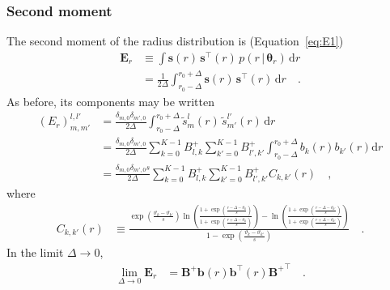 \documentclass[modern]{aastex62}
\begin{document}
\subsubsection{Second moment}
%
The second moment of the radius distribution is (Equation~\ref{eq:E1})
%
\begin{align}
    \mathbf{E}_r
     & \equiv
    \int
    \mathbf{s}(r) \,
    \mathbf{s}^\top(r) \,
    p(r \, \big| \, \pmb{\theta}_{r}) \,
    \mathrm{d}r
    \nonumber \\
     & =
    \frac{1}{2\Delta}
    \int_{r_0 - \Delta}^{r_0 + \Delta}
    \mathbf{s}(r) \,
    \mathbf{s}^\top(r) \,
    \mathrm{d}r
    \quad.
\end{align}
%
As before, its components may be written
%
%
\begin{align}
    (E_r)^{l,l'}_{m,m'}
     & =
    \frac{\delta_{m,0}\delta_{m',0}}{2\Delta}
    \int_{r_0 - \Delta}^{r_0 + \Delta}
    \tilde{s}^l_{m}(r) \,
    \tilde{s}^{l'}_{m'}(r) \,
    \mathrm{d}r
    \nonumber \\
     & =
    \frac{\delta_{m,0}\delta_{m',0}}{2\Delta}
    \sum_{k=0}^{K-1} B^+_{l,k}
    \sum_{k'=0}^{K-1} B^+_{l',k'}
    \int_{r_0 - \Delta}^{r_0 + \Delta}
    b_{k}(r)
    b_{k'}(r)
    \mathrm{d}r
    \nonumber \\
     & =
    \frac{\delta_{m,0}\delta_{m',0}s}{2\Delta}
    \sum_{k=0}^{K-1} B^+_{l,k}
    \sum_{k'=0}^{K-1} B^+_{l',k'}
    C_{k,k'}(r)
    \quad,
\end{align}
%
where
%
\begin{align}
    C_{k,k'}(r)
     & \equiv
    \frac{
        \exp\left(\frac{\vartheta_{k} - \vartheta_{k'}}{s}\right)
        \ln
        \left(
        \frac{
            1+\exp\left(\frac{r -\Delta -\vartheta_{k}}{s}\right)
        }
        {
            1+\exp\left(\frac{r + \Delta -\vartheta_{k}}{s}\right)
        }
        \right)
        -
        \ln
        \left(
        \frac{
            1+\exp\left(\frac{r -\Delta -\vartheta_{k'}}{s}\right)
        }
        {
            1+\exp\left(\frac{r + \Delta -\vartheta_{k'}}{s}\right)
        }
        \right)
    }{
        1
        -
        \exp\left(\frac{\vartheta_{k} - \vartheta_{k'}}{s}\right)
    }
    \quad.
\end{align}
%
In the limit $\Delta \rightarrow 0$,
%
\begin{align}
    \lim_{\Delta \rightarrow 0}
    \mathbf{E}_r
     & =
    \mathbf{B}^+ \mathbf{b}(r) \mathbf{b}^\top(r) {\mathbf{B}^+}^\top
    \quad.
\end{align}
%
\end{document}
